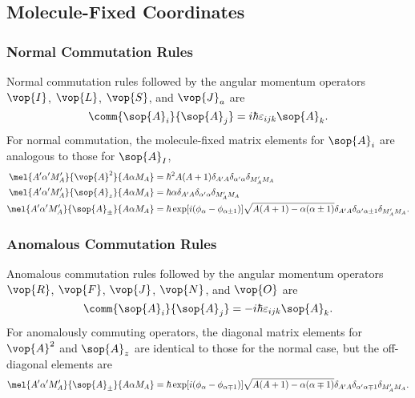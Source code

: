 \subsection{Molecule-Fixed Coordinates}

\subsubsection{Normal Commutation Rules}

Normal commutation rules followed by the angular momentum operators $\vop{I}$, $\vop{L}$, $\vop{S}$, and $\vop{J}_a$ are \cite[74]{lefebvre-brionSpectraDynamicsDiatomic2004}
\begin{equation*}
    \comm{\sop{A}_i}{\sop{A}_j} = i\hbar\varepsilon_{ijk}\sop{A}_k.
\end{equation*}
For normal commutation, the molecule-fixed matrix elements for $\sop{A}_i$ are analogous to those for $\sop{A}_I$,
\begin{align*}
    \mel{A'\alpha'M_A'}{\vop{A}^2}{A\alpha M_A}   & = \hbar^2A(A + 1)\delta_{A'A}\delta_{\alpha'\alpha}\delta_{M_A'M_A}                                                                                \\
    \mel{A'\alpha'M_A'}{\sop{A}_z}{A\alpha M_A}   & = \hbar\alpha\delta_{A'A}\delta_{\alpha'\alpha}\delta_{M_A'M_A}                                                                                    \\
    \mel{A'\alpha'M_A'}{\sop{A}_\pm}{A\alpha M_A} & = \hbar\exp[i(\phi_{\alpha} - \phi_{\alpha \pm 1})]\sqrt{A(A + 1) - \alpha(\alpha \pm 1)}\delta_{A'A}\delta_{\alpha'\alpha \pm 1}\delta_{M_A'M_A}.
\end{align*}

\subsubsection{Anomalous Commutation Rules}

Anomalous commutation rules followed by the angular momentum operators $\vop{R}$, $\vop{F}$, $\vop{J}$, $\vop{N}$, and $\vop{O}$ are \cite[74]{lefebvre-brionSpectraDynamicsDiatomic2004}
\begin{equation*}
    \comm{\sop{A}_i}{\sop{A}_j} = -i\hbar\varepsilon_{ijk}\sop{A}_k.
\end{equation*}
For anomalously commuting operators, the diagonal matrix elements for $\vop{A}^2$ and $\sop{A}_z$ are identical to those for the normal case, but the off-diagonal elements are
\begin{equation*}
    \mel{A'\alpha'M_A'}{\sop{A}_\pm}{A\alpha M_A} = \hbar\exp[i(\phi_{\alpha} - \phi_{\alpha \mp 1})]\sqrt{A(A + 1) - \alpha(\alpha \mp 1)}\delta_{A'A}\delta_{\alpha'\alpha \mp 1}\delta_{M_A'M_A}.
\end{equation*}

